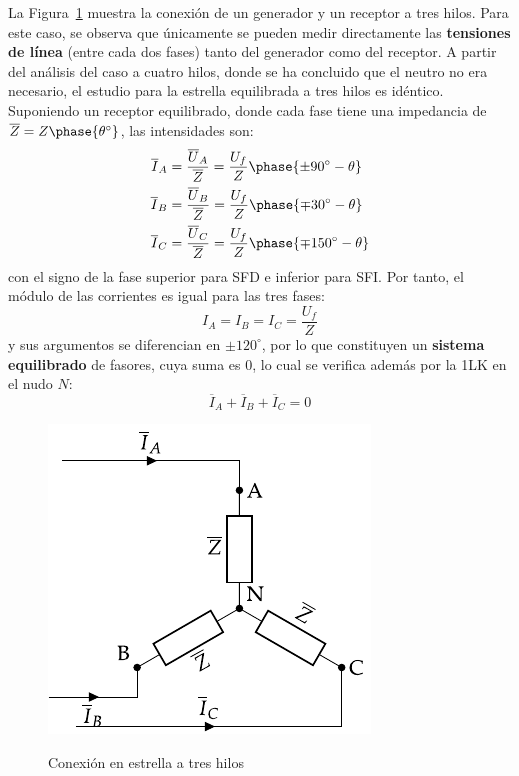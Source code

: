 	
	
	La Figura~\ref{fig:conexion_estrella_3} muestra la conexión de un generador y un receptor a tres hilos. Para este caso, se observa que únicamente se pueden medir directamente las \textbf{tensiones de línea} (entre cada dos fases) tanto del generador como del receptor. A partir del análisis del caso a cuatro hilos, donde se ha concluido que el neutro no era necesario, el estudio para la estrella equilibrada a tres hilos es idéntico. Suponiendo un receptor equilibrado, donde cada fase tiene una impedancia de $\overline{Z}=Z\phase{\theta^\circ}$, las intensidades son:
	\begin{align*}
      \overline{I}_A &= \frac{\overline{U}_A}{\overline{Z}} = \frac{U_f}{Z}\phase{{\pm 90^\circ} - \theta} \\
      \overline{I}_B &= \frac{\overline{U}_B}{\overline{Z}} = \frac{U_f}{Z}\phase{{\mp 30^\circ} - \theta}\\
      \overline{I}_C &= \frac{\overline{U}_C}{\overline{Z}} = \frac{U_f}{Z}\phase{{\mp 150^\circ} - \theta}
    \end{align*}
    con el signo de la fase superior para SFD e inferior para SFI. Por tanto, el módulo de las corrientes es igual para las tres fases: 
    \begin{equation}
        \boxed{I_A = I_B = I_C = \dfrac{U_f}{Z}}
    \end{equation}
    y sus argumentos se diferencian en $\pm120^\circ$, por lo que constituyen un \textbf{sistema equilibrado} de fasores, cuya suma es 0, lo cual se verifica además por la 1LK en el nudo $N$: 
    \begin{equation*}
        \overline{I}_A  + \overline{I}_B + \overline{I}_C = 0
    \end{equation*}
	\begin{figure}[H]
		\centering
		{\includegraphics{../figs/EstrellaEquilibrado_Receptor_SN.pdf}}
		\caption{Conexión en estrella a tres hilos}
		\label{fig:conexion_estrella_3}
	\end{figure}

